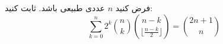     \p 
فرض کنید
$n$
عددی طبیعی باشد. ثابت کنید:
$$\sum_{k=0}^{n} 2^k \binom{n}{k} \binom{n - k}{\lfloor \frac{n-k}{2} \rfloor}  = \binom{2n + 1}{n}$$
